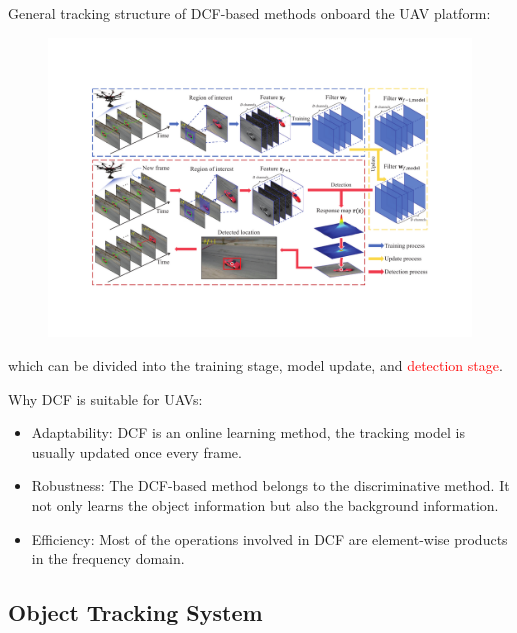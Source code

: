 \documentclass{beamer}
\begin{document}
\begin{frame}

    \addtocounter{footnote}{-1}
    General tracking structure of DCF-based methods onboard the UAV platform:

    \begin{figure}[htpb]
        \begin{center}
            \includegraphics[width=0.7\linewidth, trim={100pt 100 100 90}]{fig/tracking_3.pdf}
        \end{center}
    \end{figure}

    which can be divided into the training stage, model update, and \textcolor{red}{detection stage}.

\end{frame}

\begin{frame}
    Why DCF is suitable for UAVs:
    \begin{itemize}
        \item Adaptability: DCF is an online learning method, the tracking model is usually updated once every frame.
        \item Robustness: The DCF-based method belongs to the discriminative method. It not only learns the object information but also the background information. 
        \item Efficiency: Most of the operations involved in DCF are element-wise products in the frequency domain.
    \end{itemize}
\end{frame}

\subsection{Object Tracking System}
\end{document}
